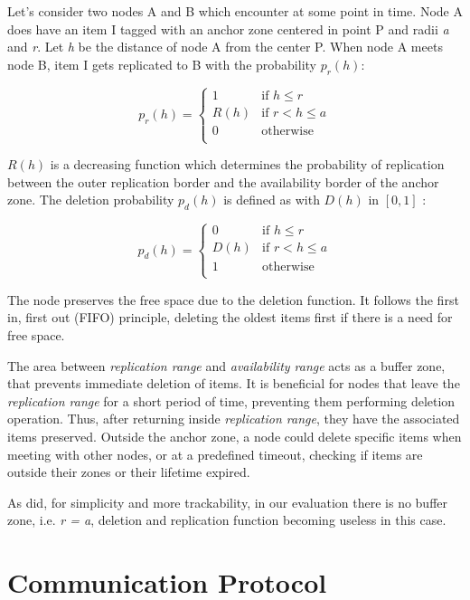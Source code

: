 Let's consider two nodes A and B which encounter at some point in time. Node A
does have an item I tagged with an anchor zone centered in point P and radii
{\it a} and {\it r}. Let {\it h} be the distance of node A from the center P.
When node A meets node B, item I gets replicated to B with the probability
$p_r(h)$:

$$p_r(h) = \begin{cases}
	1 & \text{if } h \leq r \\
	R\left(h\right) & \text{if } r < h \leq a \\
	0 & \text{otherwise} \\
\end{cases}$$

$R(h)$ is a decreasing function which determines the probability of replication
between the outer replication border and the availability border of the anchor
zone.
The deletion probability $p_d(h)$ is defined as with $D(h)$ in $[0, 1]$ :

$$p_d(h) = \begin{cases}
	0 & \text{if } h \leq r \\
	D\left(h\right) & \text{if } r < h \leq a \\
	1 & \text{otherwise} \\
\end{cases}$$

The node preserves the free space due to the deletion function. It follows the
first in, first out (FIFO) principle, deleting the oldest items first if there
is a need for free space.

The area between {\it replication range} and {\it availability range} acts as a
buffer zone, that prevents immediate deletion of items. It is beneficial
for nodes that leave the {\it replication range} for a short period of time,
preventing them performing deletion operation. Thus, after returning inside
{\it replication range}, they have the associated items preserved. Outside the
anchor zone, a node could delete specific items when meeting with other nodes,
or at a predefined timeout, checking if items are outside their zones or their
lifetime expired.

As \cite{percomfloatingcontent} did, for simplicity and more trackability, in
our evaluation there is no buffer zone, i.e. {\it r = a}, deletion and replication
function becoming useless in this case.

\section{Communication Protocol}

